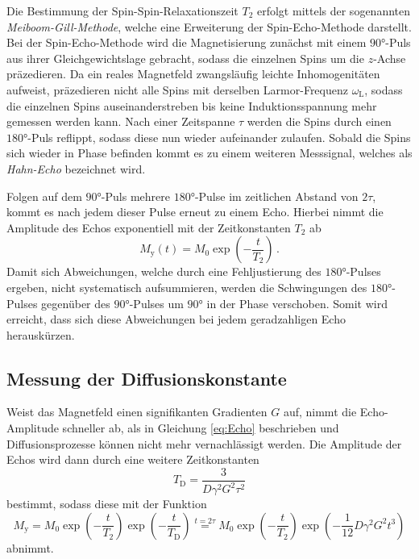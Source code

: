 Die Bestimmung der Spin-Spin-Relaxationszeit $T_2$ erfolgt mittels der sogenannten \textit{Meiboom-Gill-Methode}, welche eine Erweiterung der Spin-Echo-Methode darstellt.
Bei der Spin-Echo-Methode wird die Magnetisierung zunächst mit einem $90°$-Puls aus ihrer Gleichgewichtslage gebracht, sodass die einzelnen Spins um die $z$-Achse präzedieren.
Da ein reales Magnetfeld zwangsläufig leichte Inhomogenitäten aufweist, präzedieren nicht alle Spins mit derselben Larmor-Frequenz $\omega_\text{L}$, sodass die einzelnen Spins auseinanderstreben bis keine Induktionsspannung mehr gemessen werden kann.
Nach einer Zeitspanne $\tau$ werden die Spins durch einen $180°$-Puls reflippt, sodass diese nun wieder aufeinander zulaufen.
Sobald die Spins sich wieder in Phase befinden kommt es zu einem weiteren Messsignal, welches als \textit{Hahn-Echo} bezeichnet wird.

Folgen auf dem $90°$-Puls mehrere $180°$-Pulse im zeitlichen Abstand von $2\tau$, kommt es nach jedem dieser Pulse erneut zu einem Echo.
Hierbei nimmt die Amplitude des Echos exponentiell mit der Zeitkonstanten $T_2$ ab
\begin{equation}
    M_\text{y}(t)=M_0\exp(-\frac{t}{T_2})\, . \label{eq:Echo}
\end{equation}
Damit sich Abweichungen, welche durch eine Fehljustierung des $180°$-Pulses ergeben, nicht systematisch aufsummieren, werden die Schwingungen des $180°$-Pulses gegenüber des $90°$-Pulses um $90°$ in der Phase verschoben.
Somit wird erreicht, dass sich diese Abweichungen bei jedem geradzahligen Echo herauskürzen.

\subsection{Messung der Diffusionskonstante}
Weist das Magnetfeld einen signifikanten Gradienten $G$ auf, nimmt die Echo-Amplitude schneller ab, als in Gleichung \eqref{eq:Echo} beschrieben und Diffusionsprozesse können nicht mehr vernachlässigt werden.
Die Amplitude der Echos wird dann durch eine weitere Zeitkonstanten
\begin{equation}
    T_\text{D}=\frac{3}{D\gamma^2 G^2\tau^2}
\end{equation}
bestimmt, sodass diese mit der Funktion
\begin{equation}
    M_\text{y}=M_0\exp(-\frac{t}{T_2})\exp(-\frac{t}{T_\text{D}}) \stackrel{t=2\tau}{=} M_0\exp(-\frac{t}{T_2})\exp(-\frac{1}{12}D\gamma^2 G^2 t^3)
\end{equation}
abnimmt.



